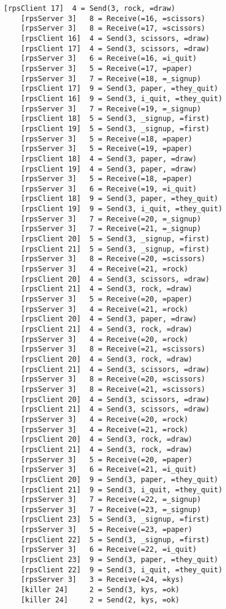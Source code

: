 \documentclass{article}
\begin{document}
\begin{Verbatim}[tabsize=4]
    [rpsClient 17]  4 = Send(3, rock, =draw)
    [rpsServer 3]   8 = Receive(=16, =scissors)
    [rpsServer 3]   8 = Receive(=17, =scissors)
    [rpsClient 16]  4 = Send(3, scissors, =draw)
    [rpsClient 17]  4 = Send(3, scissors, =draw)
    [rpsServer 3]   6 = Receive(=16, =i_quit)
    [rpsServer 3]   5 = Receive(=17, =paper)
    [rpsServer 3]   7 = Receive(=18, =_signup)
    [rpsClient 17]  9 = Send(3, paper, =they_quit)
    [rpsClient 16]  9 = Send(3, i_quit, =they_quit)
    [rpsServer 3]   7 = Receive(=19, =_signup)
    [rpsClient 18]  5 = Send(3, _signup, =first)
    [rpsClient 19]  5 = Send(3, _signup, =first)
    [rpsServer 3]   5 = Receive(=18, =paper)
    [rpsServer 3]   5 = Receive(=19, =paper)
    [rpsClient 18]  4 = Send(3, paper, =draw)
    [rpsClient 19]  4 = Send(3, paper, =draw)
    [rpsServer 3]   5 = Receive(=18, =paper)
    [rpsServer 3]   6 = Receive(=19, =i_quit)
    [rpsClient 18]  9 = Send(3, paper, =they_quit)
    [rpsClient 19]  9 = Send(3, i_quit, =they_quit)
    [rpsServer 3]   7 = Receive(=20, =_signup)
    [rpsServer 3]   7 = Receive(=21, =_signup)
    [rpsClient 20]  5 = Send(3, _signup, =first)
    [rpsClient 21]  5 = Send(3, _signup, =first)
    [rpsServer 3]   8 = Receive(=20, =scissors)
    [rpsServer 3]   4 = Receive(=21, =rock)
    [rpsClient 20]  4 = Send(3, scissors, =draw)
    [rpsClient 21]  4 = Send(3, rock, =draw)
    [rpsServer 3]   5 = Receive(=20, =paper)
    [rpsServer 3]   4 = Receive(=21, =rock)
    [rpsClient 20]  4 = Send(3, paper, =draw)
    [rpsClient 21]  4 = Send(3, rock, =draw)
    [rpsServer 3]   4 = Receive(=20, =rock)
    [rpsServer 3]   8 = Receive(=21, =scissors)
    [rpsClient 20]  4 = Send(3, rock, =draw)
    [rpsClient 21]  4 = Send(3, scissors, =draw)
    [rpsServer 3]   8 = Receive(=20, =scissors)
    [rpsServer 3]   8 = Receive(=21, =scissors)
    [rpsClient 20]  4 = Send(3, scissors, =draw)
    [rpsClient 21]  4 = Send(3, scissors, =draw)
    [rpsServer 3]   4 = Receive(=20, =rock)
    [rpsServer 3]   4 = Receive(=21, =rock)
    [rpsClient 20]  4 = Send(3, rock, =draw)
    [rpsClient 21]  4 = Send(3, rock, =draw)
    [rpsServer 3]   5 = Receive(=20, =paper)
    [rpsServer 3]   6 = Receive(=21, =i_quit)
    [rpsClient 20]  9 = Send(3, paper, =they_quit)
    [rpsClient 21]  9 = Send(3, i_quit, =they_quit)
    [rpsServer 3]   7 = Receive(=22, =_signup)
    [rpsServer 3]   7 = Receive(=23, =_signup)
    [rpsClient 23]  5 = Send(3, _signup, =first)
    [rpsServer 3]   5 = Receive(=23, =paper)
    [rpsClient 22]  5 = Send(3, _signup, =first)
    [rpsServer 3]   6 = Receive(=22, =i_quit)
    [rpsClient 23]  9 = Send(3, paper, =they_quit)
    [rpsClient 22]  9 = Send(3, i_quit, =they_quit)
    [rpsServer 3]   3 = Receive(=24, =kys)
    [killer 24]     2 = Send(3, kys, =ok)
    [killer 24]     2 = Send(2, kys, =ok)
\end{Verbatim}
\end{document}
